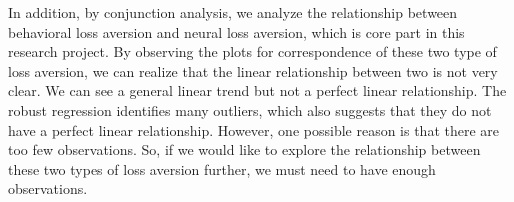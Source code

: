 \par \indent In addition, by conjunction analysis, we analyze the relationship 
between behavioral loss aversion and neural loss aversion, which is core part 
in this research project. By observing the plots for correspondence of these 
two type of loss aversion, we can realize that the linear relationship between 
two is not very clear. We can see a general linear trend but not a perfect 
linear relationship. The robust regression identifies many outliers, which also 
suggests that they do not have a perfect linear relationship. However, one 
possible reason is that there are too few observations. So, if we would like to 
explore the relationship between these two types of loss aversion further, we 
must need to have enough observations.

